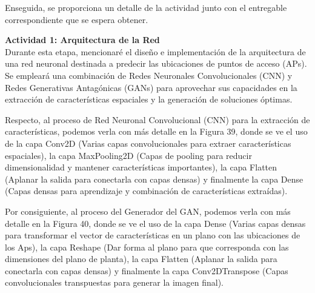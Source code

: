 \endgroup

 Enseguida, se proporciona un detalle de la actividad junto con el entregable correspondiente que se espera obtener.
 
 \textbf{Actividad 1: Arquitectura de la Red}
 \\
 Durante esta etapa, mencionaré el diseño e implementación de la arquitectura de una red neuronal destinada a predecir las ubicaciones de puntos de acceso (APs). Se empleará una combinación de Redes Neuronales Convolucionales (CNN) y Redes Generativas Antagónicas (GANs) para aprovechar sus capacidades en la extracción de características espaciales y la generación de soluciones óptimas.
 
 Respecto, al proceso de Red Neuronal Convolucional (CNN) para la extracción de características, podemos verla con más detalle en la Figura 39, donde se ve el uso de la capa Conv2D (Varias capas convolucionales para extraer características espaciales), la capa MaxPooling2D (Capas de pooling para reducir dimensionalidad y mantener características importantes), la capa Flatten (Aplanar la salida para conectarla con capas densas) y finalmente la capa Dense (Capas densas para aprendizaje y combinación de características extraídas).
 
 
 
 Por consiguiente, al proceso del Generador del GAN, podemos verla con más detalle en la Figura 40, donde se ve el uso de la capa Dense (Varias capas densas para transformar el vector de características en un plano con las ubicaciones de los Aps), la capa Reshape (Dar forma al plano para que corresponda con las dimensiones del plano de planta), la capa Flatten (Aplanar la salida para conectarla con capas densas) y finalmente la capa Conv2DTranspose (Capas convolucionales transpuestas para generar la imagen final).
 
 
